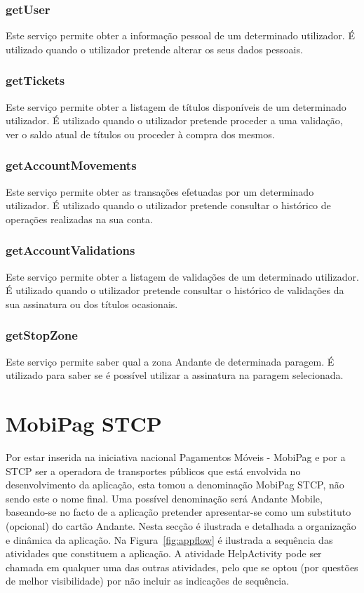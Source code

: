 \subsubsection{getUser}

Este serviço permite obter a informação pessoal de um determinado utilizador. É utilizado quando o utilizador pretende alterar os seus dados pessoais.

\subsubsection{getTickets}

Este serviço permite obter a listagem de títulos disponíveis de um determinado utilizador. É utilizado quando o utilizador pretende proceder a uma validação, ver o saldo atual de títulos ou proceder à compra dos mesmos.

\subsubsection{getAccountMovements}

Este serviço permite obter as transações efetuadas por um determinado utilizador. É utilizado quando o utilizador pretende consultar o histórico de operações realizadas na sua conta.

\subsubsection{getAccountValidations}

Este serviço permite obter a listagem de validações de um determinado utilizador. É utilizado quando o utilizador pretende consultar o histórico de validações da sua assinatura ou dos títulos ocasionais.

\subsubsection{getStopZone}

Este serviço permite saber qual a zona Andante de determinada paragem. É utilizado para saber se é possível utilizar a assinatura na paragem selecionada.

\section{MobiPag STCP}

Por estar inserida na iniciativa nacional Pagamentos Móveis - MobiPag \cite{cedt} e por a STCP ser a operadora de transportes públicos que está envolvida no desenvolvimento da aplicação, esta tomou a denominação MobiPag STCP, não sendo este o nome final. Uma possível denominação será Andante Mobile, baseando-se no facto de a aplicação pretender apresentar-se como um substituto (opcional) do cartão Andante.
Nesta secção é ilustrada e detalhada a organização e dinâmica da aplicação. Na Figura~\ref{fig:appflow} é ilustrada a sequência das atividades que constituem a aplicação. A atividade HelpActivity pode ser chamada em qualquer uma das outras atividades, pelo que se optou (por questões de melhor visibilidade) por não incluir as indicações de sequência.

